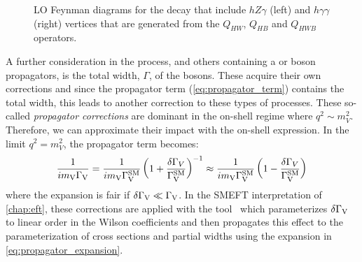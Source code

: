 \begin{figure}
  \centering
  \caption[LO Feynman Diagrams for the \Hfl Decay that Include $hZ\gamma$ and $h\gamma\gamma$ Vertices]{LO Feynman diagrams for the \Hfl decay that include $hZ\gamma$ (left) and $h\gamma\gamma$ (right) vertices that are generated from the $Q_{HW}$, $Q_{HB}$ and $Q_{HWB}$ operators.}\label{fig:H4l_feynman_za}
\end{figure}

A further consideration in the \Hfl process, and others containing a \PW or \PZ boson propagators, is the total width, $\Gamma$, of the bosons. These acquire their own \Lsix corrections and since the propagator term (\cref{eq:propagator_term}) contains the total width, this leads to another correction to these types of processes. These so-called \textit{propagator corrections} are dominant in the on-shell regime where $q^2 \sim m_V^2$. Therefore, we can approximate their impact with the on-shell expression. In the limit $q^2 = m_V^2$, the propagator term becomes:
\begin{equation}
  \frac{1}{im_\mathrm{V} \Gamma_\mathrm{V}} = \frac{1}{i m_\mathrm{V} \Gamma_\mathrm{V}^{\text{SM}}} \left( 1 + \frac{\delta\Gamma_V}{\Gamma_\mathrm{V}^{\text{SM}}} \right)^{-1} \approx \frac{1}{i m_\mathrm{V} \Gamma_\mathrm{V}^{\text{SM}}} \left( 1 - \frac{\delta\Gamma_V}{\Gamma_\mathrm{V}^{\text{SM}}} \right)
  \label{eq:propagator_expansion} 
\end{equation}
where the expansion is fair if $\delta\Gamma_\mathrm{V} \ll \Gamma_\mathrm{V}$. In the SMEFT interpretation of \cref{chap:eft}, these corrections are applied with the \SMEFTsim tool~\cite{Brivio:2020onw} which parameterizes $\delta\Gamma_\mathrm{V}$ to linear order in the Wilson coefficients and then propagates this effect to the parameterization of cross sections and partial widths using the expansion in \cref{eq:propagator_expansion}.